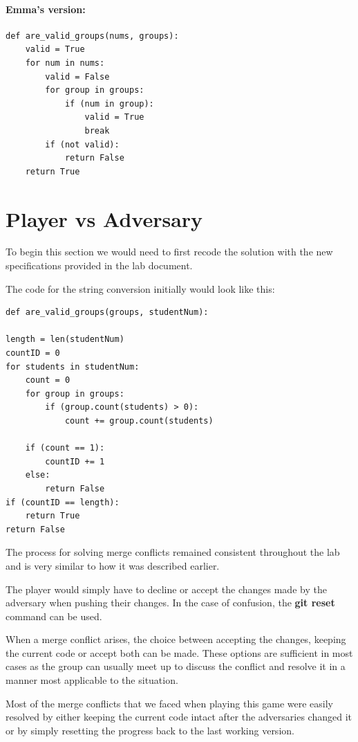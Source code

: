 \documentclass[twocolumn, 10pt]{article}
\begin{document}
\paragraph{Emma's version:}

\footnotesize
\begin{verbatim}
def are_valid_groups(nums, groups):
    valid = True
    for num in nums:
        valid = False
        for group in groups:
            if (num in group): 
                valid = True
                break
        if (not valid):
            return False
    return True
\end{verbatim}
\normalsize

\section{Player vs Adversary}

To begin this section we would need to first recode the solution with the new specifications provided in the lab document. 

The code for the string conversion initially would look like this:

\footnotesize
\begin{verbatim}
def are_valid_groups(groups, studentNum):

length = len(studentNum)
countID = 0   
for students in studentNum:
    count = 0
    for group in groups:
        if (group.count(students) > 0):
            count += group.count(students)

    if (count == 1):
        countID += 1
    else:
        return False
if (countID == length):
    return True
return False
\end{verbatim}
\normalsize

The process for solving merge conflicts remained consistent throughout the lab and is very similar to how it was described earlier.

The player would simply have to decline or accept the changes made by the adversary when pushing their changes. In the case of confusion, the \textbf{git reset} command can be used.

When a merge conflict arises, the choice between accepting the changes, keeping the current code or accept both can be made. These options are sufficient in most cases as the group can usually meet up to discuss the conflict and resolve it in a manner most applicable to the situation.

Most of the merge conflicts that we faced when playing this game were easily resolved by either keeping the current code intact after the adversaries changed it or by simply resetting the progress back to the last working version.
\end{document}
